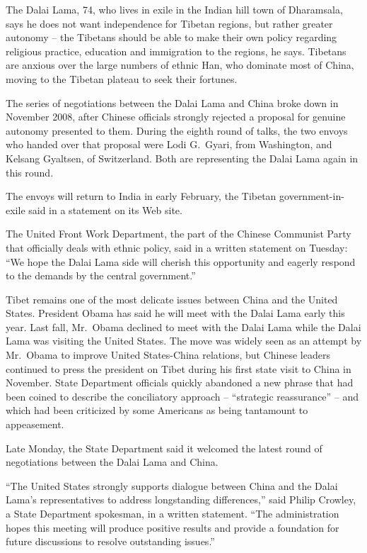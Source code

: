 ﻿\documentclass[12pt]{article}
\begin{document}
The Dalai Lama, 74, who lives in exile in the Indian hill town of Dharamsala, says he does not want
independence for Tibetan regions, but rather greater autonomy -- the Tibetans should be able to make
their own policy regarding religious practice, education and immigration to the regions, he says.
Tibetans are anxious over the large numbers of ethnic Han, who dominate most of China, moving to the
Tibetan plateau to seek their fortunes.

The series of negotiations between the Dalai Lama and China broke down in November 2008, after
Chinese officials strongly rejected a proposal for genuine autonomy presented to them. During the
eighth round of talks, the two envoys who handed over that proposal were Lodi G.~Gyari, from
Washington, and Kelsang Gyaltsen, of Switzerland. Both are representing the Dalai Lama again in this
round.

The envoys will return to India in early February, the Tibetan government-in-exile said in a
statement on its Web site.

The United Front Work Department, the part of the Chinese Communist Party that officially deals with
ethnic policy, said in a written statement on Tuesday: ``We hope the Dalai Lama side will cherish
this opportunity and eagerly respond to the demands by the central government.''

Tibet remains one of the most delicate issues between China and the United States. President Obama
has said he will meet with the Dalai Lama early this year. Last fall, Mr.~Obama declined to meet
with the Dalai Lama while the Dalai Lama was visiting the United States. The move was widely seen as
an attempt by Mr.~Obama to improve United States-China relations, but Chinese leaders continued to
press the president on Tibet during his first state visit to China in November. State Department
officials quickly abandoned a new phrase that had been coined to describe the conciliatory approach
-- ``strategic reassurance'' -- and which had been criticized by some Americans as being tantamount
to appeasement.

Late Monday, the State Department said it welcomed the latest round of negotiations between the
Dalai Lama and China.

``The United States strongly supports dialogue between China and the Dalai Lama's representatives to
address longstanding differences,'' said Philip Crowley, a State Department spokesman, in a written
statement. ``The administration hopes this meeting will produce positive results and provide a
foundation for future discussions to resolve outstanding issues.''
\end{document}
